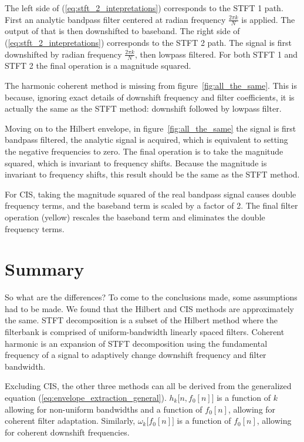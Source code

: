 \documentclass [11pt, proquest,oneside] {ganter_thesis}[2015/03/03]
\begin{document}
The left side of (\ref{eq:stft_2_intepretations}) corresponds to the STFT 1 path.  First an analytic bandpass filter centered at radian frequency $\frac{2\pi k}{N}$ is applied.  The output of that is then downshifted to baseband.  The right side of (\ref{eq:stft_2_intepretations}) corresponds to the STFT 2 path.  The signal is first downshifted by radian frequency $\frac{2\pi k}{N}$, then lowpass filtered.  For both STFT 1 and STFT 2 the final operation is a magnitude squared.

The harmonic coherent method is missing from figure~\ref{fig:all_the_same}.  This is because, ignoring exact details of downshift frequency and filter coefficients, it is actually the same as the STFT method: downshift followed by lowpass filter.

Moving on to the Hilbert envelope, in figure~\ref{fig:all_the_same} the signal is first bandpass filtered, the analytic signal is acquired, which is equivalent to setting the negative frequencies to zero.  The final operation is to take the magnitude squared, which is invariant to frequency shifts.  Because the magnitude is invariant to frequency shifts, this result should be the same as the STFT method.

For CIS, taking the magnitude squared of the real bandpass signal causes double frequency terms, and the baseband term is scaled by a factor of 2.  The final filter operation (yellow) rescales the baseband term and eliminates the double frequency terms.

\section{Summary}

So what are the differences?  To come to the conclusions made, some assumptions had to be made.  We found that the Hilbert and CIS methods are approximately the same.  STFT decomposition is a subset of the Hilbert method where the filterbank is comprised of uniform-bandwidth linearly spaced filters.  Coherent harmonic is an expansion of STFT decomposition using the fundamental frequency of a signal to adaptively change downshift frequency and filter bandwidth.

Excluding CIS, the other three methods can all be derived from the generalized equation (\ref{eq:envelope_extraction_general}).  $h_k\Big[n,f_0[n]\Big]$ is a function of $k$ allowing for non-uniform bandwidths and a function of $f_0[n]$, allowing for coherent filter adaptation.  Similarly, $\omega_k\big[f_0[n]\big]$ is a function of $f_0[n]$, allowing for coherent downshift frequencies.
\end{document}
